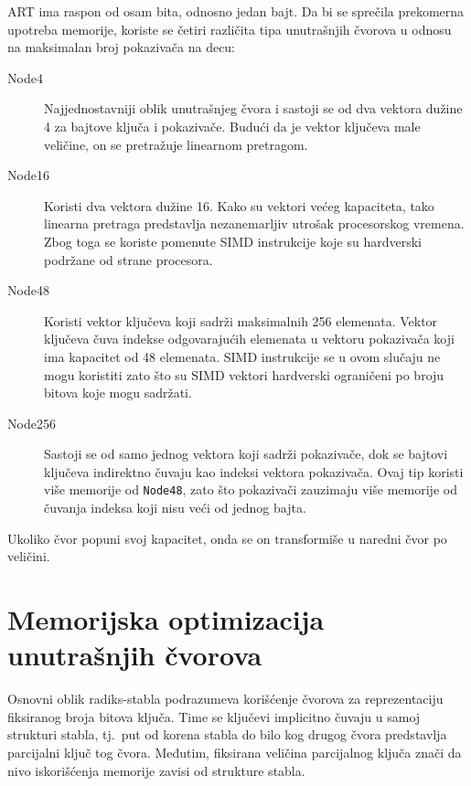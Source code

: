 \documentclass[12pt,oneside]{memoir}
\begin{document}
ART ima raspon od osam bita, odnosno jedan bajt. Da bi se sprečila prekomerna
upotreba memorije, koriste se četiri različita tipa unutrašnjih čvorova u odnosu
na maksimalan broj pokazivača na decu:

\begin{description}

  \item[Node4] Najjednostavniji oblik unutrašnjeg čvora
        i sastoji se od
        dva vektora dužine 4 za bajtove ključa i pokazivače.
        Budući da je vektor ključeva male veličine, on se pretražuje
        linearnom pretragom.
  \item[Node16] Koristi dva vektora dužine 16.
        Kako su vektori većeg kapaciteta, tako linearna
        pretraga predstavlja nezanemarljiv utrošak procesorskog
        vremena. Zbog toga se koriste pomenute SIMD instrukcije koje su
        hardverski podržane od strane procesora.
  \item[Node48]
        Koristi vektor ključeva koji sadrži maksimalnih 256 elemenata.
        Vektor ključeva čuva indekse odgovarajućih elemenata u vektoru
        pokazivača koji ima kapacitet od 48 elemenata.
        SIMD instrukcije se u ovom slučaju ne mogu koristiti zato što su
        SIMD vektori hardverski ograničeni po broju bitova koje mogu sadržati.
  \item[Node256] Sastoji se od samo jednog vektora koji sadrži pokazivače,
        dok se bajtovi ključeva indirektno čuvaju kao indeksi vektora
        pokazivača. Ovaj tip koristi više memorije od \texttt{Node48},
        zato što pokazivači zauzimaju više memorije od čuvanja indeksa
        koji nisu veći od jednog bajta.

\end{description}

\noindent Ukoliko čvor popuni svoj kapacitet, onda se on transformiše u naredni
čvor po veličini.

\section{Memorijska optimizacija unutrašnjih čvorova}

Osnovni oblik radiks-stabla podrazumeva korišćenje čvorova za
reprezentaciju fiksiranog broja bitova ključa.
Time se ključevi implicitno čuvaju u samoj
strukturi stabla, tj.\ put od korena stabla do bilo kog drugog čvora
predstavlja parcijalni ključ
tog čvora. Međutim, fiksirana veličina parcijalnog ključa
znači da nivo iskorišćenja memorije zavisi od strukture stabla.
\end{document}
